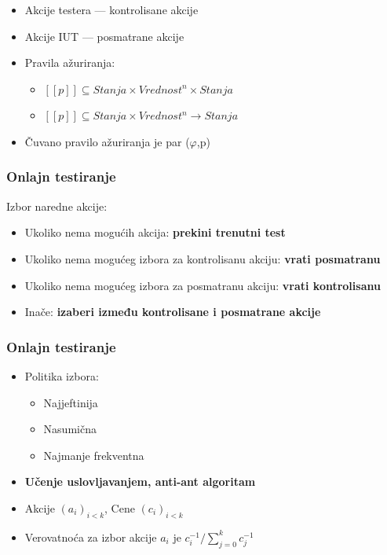 \documentclass[11pt]{beamer}
\theoremstyle{definition}
\begin{document}
{\begin{frame}
\begin{itemize}
	\item Akcije testera --- kontrolisane akcije
	\item Akcije IUT --- posmatrane akcije


\item Pravila ažuriranja:
\begin{itemize}
	\item $[[p]] \subseteq Stanja \times Vrednost^n \times Stanja$
	\item $[[p]] \subseteq Stanja \times Vrednost^n \rightarrow Stanja$
\end{itemize}

\item Čuvano pravilo ažuriranja je par ($\varphi$,p) 
\end{itemize}
\end{frame}


\begin{frame}
\frametitle{Onlajn testiranje}

Izbor naredne akcije:
\begin {itemize}
	\item Ukoliko nema mogućih akcija: \newline \textbf{prekini trenutni test}
	\item Ukoliko nema mogućeg izbora za kontrolisanu akciju: \newline \textbf{vrati posmatranu}
	\item Ukoliko nema mogućeg izbora za posmatranu akciju: \newline \textbf{vrati kontrolisanu}
	\item Inače: \newline \textbf{izaberi između kontrolisane i posmatrane akcije}
\end {itemize}

\end{frame}

\begin{frame}
\frametitle{Onlajn testiranje}

\begin{itemize}
\item Politika izbora:
\begin{itemize}
	\item Najjeftinija
	\item Nasumična
	\item Najmanje frekventna
\end{itemize}
\item \textbf{Učenje uslovljavanjem, anti-ant algoritam}
\item Akcije $(a_i)_{i < k}$, Cene $(c_i)_{i < k}$
\item Verovatnoća za izbor akcije $a_i$ je $c_i^{-1} / \sum_{j=0}^{k} c_j^{-1}$
\end{itemize}
\end{frame}

}
\end{document}
